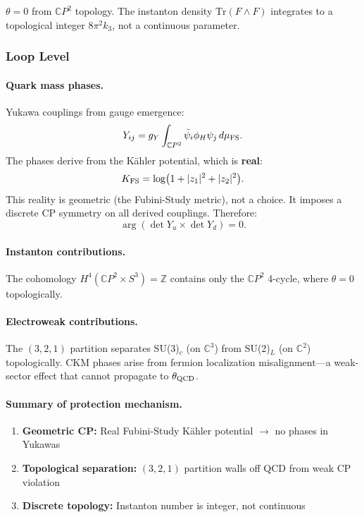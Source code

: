 $\theta = 0$ from $\mathbb{C}P^2$ topology. The instanton density $\text{Tr}(F \wedge F)$ 
integrates to a topological integer $8\pi^2 k_3$, not a continuous parameter.

\subsubsection{Loop Level}

\paragraph{Quark mass phases.}
Yukawa couplings from gauge emergence:
\begin{equation}
Y_{ij} = g_Y \int_{\mathbb{C}P^2} \bar{\psi}_i \phi_H \psi_j \, d\mu_{\rm FS}.
\end{equation}
The phases derive from the K\"ahler potential, which is \textbf{real}:
\begin{equation}
K_{\rm FS} = \log(1 + |z_1|^2 + |z_2|^2).
\end{equation}
This reality is geometric (the Fubini-Study metric), not a choice. It imposes a discrete CP symmetry on all derived couplings. Therefore:
\begin{equation}
\arg(\det Y_u \times \det Y_d) = 0.
\end{equation}

\paragraph{Instanton contributions.}
The cohomology $H^4(\mathbb{C}P^2 \times S^3) = \mathbb{Z}$ contains only the 
$\mathbb{C}P^2$ 4-cycle, where $\theta = 0$ topologically.

\paragraph{Electroweak contributions.}
The $(3,2,1)$ partition separates SU(3)$_c$ (on $\mathbb{C}^3$) from SU(2)$_L$ 
(on $\mathbb{C}^2$) topologically. CKM phases arise from fermion localization misalignment---a weak-sector effect that cannot propagate to $\theta_{\rm QCD}$.

\paragraph{Summary of protection mechanism.}
\begin{enumerate}
\item \textbf{Geometric CP:} Real Fubini-Study K\"ahler potential $\to$ no phases in Yukawas
\item \textbf{Topological separation:} $(3,2,1)$ partition walls off QCD from weak CP violation
\item \textbf{Discrete topology:} Instanton number is integer, not continuous
\end{enumerate}

